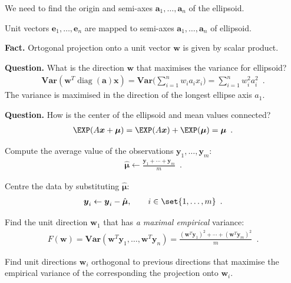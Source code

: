 \documentclass[landscape,footrule]{foils}
\renewcommand{\vec}[1]{\boldsymbol{#1}}
\renewcommand{\VAR}{\mathbf{Var}}
\DeclareMathOperator{\diag}{diag}
\begin{document}
\begin{triangles}
\item We need to find the origin and semi-axes $\vec{a}_1,\ldots,\vec{a}_n$ of the ellipsoid.
\item Unit vectors $\vec{e}_1,\ldots,\vec{e}_n$ are mapped to semi-axes $\vec{a}_1,\ldots,\vec{a}_n$ of ellipsoid.
\end{triangles}



\textbf{Fact.} Ortogonal projection onto a unit vector $\vec{w}$  is given by scalar product.\vspace*{0.5cm}

\textbf{Question.} What is the direction $\vec{w}$ that maximises the variance for ellipsoid?
\begin{align*}
\VAR(\vec{w}^T \diag(\vec{a})\vec{x})=\VAR\Biggl(\sum_{i=1}^n w_i a_i x_i\Biggr)= \sum_{i=1}^n w_i^2 a_i^2\enspace. 
\end{align*}
The variance is maximised in the direction of the longest ellipse axis $a_1$. \vspace*{0.5cm}


\textbf{Question.}
How is the center of the ellipsoid and mean values connected?
\begin{align*}
\EXP(A\vec{x}+\vec{\mu})=\EXP(A\vec{x})+\EXP(\vec{\mu})= \vec{\mu}\enspace. 
\end{align*}



\begin{triangles}
\item Compute the average value of the observations $\vec{y}_1,\ldots,\vec{y}_m$: 
\begin{align*}
\hat{\vec{\mu}}\gets\frac{\vec{y}_1+\cdots+\vec{y}_m}{m}\enspace.
\end{align*}
\item Centre the data by substituting $\hat{\vec{\mu}}$:
\begin{align*}
\vec{y}_i\gets \vec{y}_i-\hat{\vec{\mu}},\qquad i\in\set{1,\ldots,m}\enspace.
\end{align*}
\item Find the unit direction $\vec{w}_1$ that has \emph{a maximal empirical} variance: 
\begin{align*}
F(\vec{w})=\VAR(\vec{w}^T\vec{y}_1,\ldots,\vec{w}^T\vec{y}_n)=\frac{(\vec{w}^T\vec{y}_1)^2+\cdots+ (\vec{w}^T\vec{y}_m)^2}{m}\enspace.
\end{align*}
\item Find unit directions $\vec{w}_i$ orthogonal to previous directions that maximise the empirical variance of the corresponding the projection onto $\vec{w}_i$.  
\end{triangles}
\end{document}
